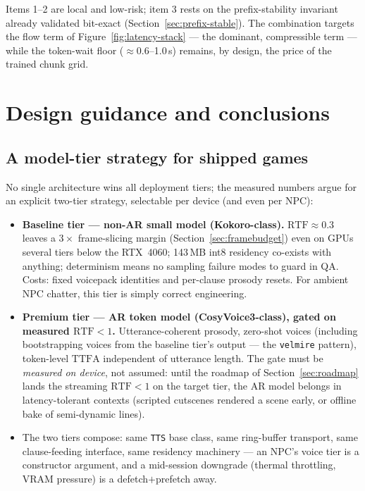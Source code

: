 \documentclass[11pt,a4paper]{article}
\newcommand{\RTF}{\ensuremath{\mathrm{RTF}}}
\newcommand{\TTFA}{\ensuremath{\mathrm{TTFA}}}
\newcommand{\code}[1]{\texttt{#1}}
\begin{document}
Items 1--2 are local and low-risk; item 3 rests on the prefix-stability invariant
already validated bit-exact (Section~\ref{sec:prefix-stable}). The combination targets
the flow term of Figure~\ref{fig:latency-stack} --- the dominant, compressible term ---
while the token-wait floor ($\approx$0.6--1.0\,s) remains, by design, the price of the
trained chunk grid.

\section{Design guidance and conclusions}
\label{sec:conclusions}

\subsection{A model-tier strategy for shipped games}

No single architecture wins all deployment tiers; the measured numbers argue for an
explicit two-tier strategy, selectable per device (and even per NPC):

\begin{itemize}[leftmargin=2em]
\item \textbf{Baseline tier --- non-AR small model (Kokoro-class).} $\RTF \approx 0.3$
leaves a $3\times$ frame-slicing margin (Section~\ref{sec:framebudget}) even on GPUs
several tiers below the RTX~4060; 143\,MB int8 residency co-exists with anything;
determinism means no sampling failure modes to guard in QA. Costs: fixed voicepack
identities and per-clause prosody resets. For ambient NPC chatter, this tier is simply
correct engineering.
\item \textbf{Premium tier --- AR token model (CosyVoice3-class), gated on measured
$\RTF < 1$.} Utterance-coherent prosody, zero-shot voices (including bootstrapping
voices from the baseline tier's output --- the \code{velmire} pattern), token-level
\TTFA{} independent of utterance length. The gate must be \emph{measured on device},
not assumed: until the roadmap of Section~\ref{sec:roadmap} lands the streaming
$\RTF < 1$ on the target tier, the AR model belongs in latency-tolerant contexts
(scripted cutscenes rendered a scene early, or offline bake of semi-dynamic lines).
\item The two tiers compose: same \code{TTS} base class, same ring-buffer transport,
same clause-feeding interface, same residency machinery --- an NPC's voice tier is a
constructor argument, and a mid-session downgrade (thermal throttling, VRAM pressure)
is a defetch$+$prefetch away.
\end{itemize}
\end{document}
